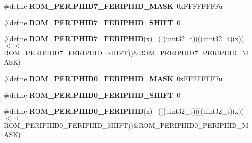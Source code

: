 \begin{DoxyCompactItemize}
\item 
\hypertarget{group___r_o_m___register___masks_ga46d62ff696136480044fa6bd78597be6}{}\#define {\bfseries R\+O\+M\+\_\+\+P\+E\+R\+I\+P\+H\+I\+D7\+\_\+\+P\+E\+R\+I\+P\+H\+I\+D\+\_\+\+M\+A\+S\+K}~0x\+F\+F\+F\+F\+F\+F\+F\+Fu\label{group___r_o_m___register___masks_ga46d62ff696136480044fa6bd78597be6}

\item 
\hypertarget{group___r_o_m___register___masks_ga660f3354bf252cb5c5a72b828ba683bd}{}\#define {\bfseries R\+O\+M\+\_\+\+P\+E\+R\+I\+P\+H\+I\+D7\+\_\+\+P\+E\+R\+I\+P\+H\+I\+D\+\_\+\+S\+H\+I\+F\+T}~0\label{group___r_o_m___register___masks_ga660f3354bf252cb5c5a72b828ba683bd}

\item 
\hypertarget{group___r_o_m___register___masks_ga32542f8a2b9d9da78a36dd91c1d52faf}{}\#define {\bfseries R\+O\+M\+\_\+\+P\+E\+R\+I\+P\+H\+I\+D7\+\_\+\+P\+E\+R\+I\+P\+H\+I\+D}(x)                            ~(((uint32\+\_\+t)(((uint32\+\_\+t)(x))$<$$<$R\+O\+M\+\_\+\+P\+E\+R\+I\+P\+H\+I\+D7\+\_\+\+P\+E\+R\+I\+P\+H\+I\+D\+\_\+\+S\+H\+I\+F\+T))\&R\+O\+M\+\_\+\+P\+E\+R\+I\+P\+H\+I\+D7\+\_\+\+P\+E\+R\+I\+P\+H\+I\+D\+\_\+\+M\+A\+S\+K)\label{group___r_o_m___register___masks_ga32542f8a2b9d9da78a36dd91c1d52faf}

\item 
\hypertarget{group___r_o_m___register___masks_ga2dfed5a6af54f8d29e984653d14a2d1a}{}\#define {\bfseries R\+O\+M\+\_\+\+P\+E\+R\+I\+P\+H\+I\+D0\+\_\+\+P\+E\+R\+I\+P\+H\+I\+D\+\_\+\+M\+A\+S\+K}~0x\+F\+F\+F\+F\+F\+F\+F\+Fu\label{group___r_o_m___register___masks_ga2dfed5a6af54f8d29e984653d14a2d1a}

\item 
\hypertarget{group___r_o_m___register___masks_gaacd7e0172c630fb56d8d465c16111feb}{}\#define {\bfseries R\+O\+M\+\_\+\+P\+E\+R\+I\+P\+H\+I\+D0\+\_\+\+P\+E\+R\+I\+P\+H\+I\+D\+\_\+\+S\+H\+I\+F\+T}~0\label{group___r_o_m___register___masks_gaacd7e0172c630fb56d8d465c16111feb}

\item 
\hypertarget{group___r_o_m___register___masks_gae6e575a83addd21467084313f9872814}{}\#define {\bfseries R\+O\+M\+\_\+\+P\+E\+R\+I\+P\+H\+I\+D0\+\_\+\+P\+E\+R\+I\+P\+H\+I\+D}(x)                            ~(((uint32\+\_\+t)(((uint32\+\_\+t)(x))$<$$<$R\+O\+M\+\_\+\+P\+E\+R\+I\+P\+H\+I\+D0\+\_\+\+P\+E\+R\+I\+P\+H\+I\+D\+\_\+\+S\+H\+I\+F\+T))\&R\+O\+M\+\_\+\+P\+E\+R\+I\+P\+H\+I\+D0\+\_\+\+P\+E\+R\+I\+P\+H\+I\+D\+\_\+\+M\+A\+S\+K)\label{group___r_o_m___register___masks_gae6e575a83addd21467084313f9872814}


\end{DoxyCompactItemize}

